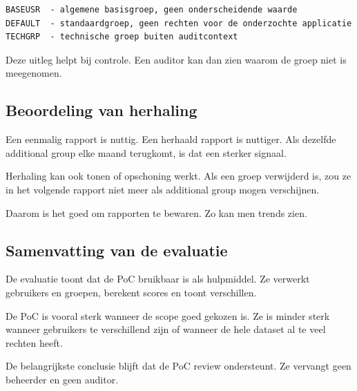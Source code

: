 \begin{verbatim}
BASEUSR  - algemene basisgroep, geen onderscheidende waarde
DEFAULT  - standaardgroep, geen rechten voor de onderzochte applicatie
TECHGRP  - technische groep buiten auditcontext
\end{verbatim}

Deze uitleg helpt bij controle. Een auditor kan dan zien waarom de groep niet is meegenomen.

\subsection*{Beoordeling van herhaling}

Een eenmalig rapport is nuttig. Een herhaald rapport is nuttiger. Als dezelfde additional group elke maand terugkomt, is dat een sterker signaal.

Herhaling kan ook tonen of opschoning werkt. Als een groep verwijderd is, zou ze in het volgende rapport niet meer als additional group mogen verschijnen.

Daarom is het goed om rapporten te bewaren. Zo kan men trends zien.

\subsection*{Samenvatting van de evaluatie}

De evaluatie toont dat de PoC bruikbaar is als hulpmiddel. Ze verwerkt gebruikers en groepen, berekent scores en toont verschillen.

De PoC is vooral sterk wanneer de scope goed gekozen is. Ze is minder sterk wanneer gebruikers te verschillend zijn of wanneer de hele dataset al te veel rechten heeft.

De belangrijkste conclusie blijft dat de PoC review ondersteunt. Ze vervangt geen beheerder en geen auditor.
